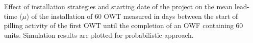\label{fig:strategies}
Effect of installation strategies and starting date of the project on the mean lead-time ($\mu$) of the installation of 60 OWT measured in days between the start of pilling activity of the first OWT until the completion of an OWF containing 60 units. Simulation results are plotted for probabilistic approach.